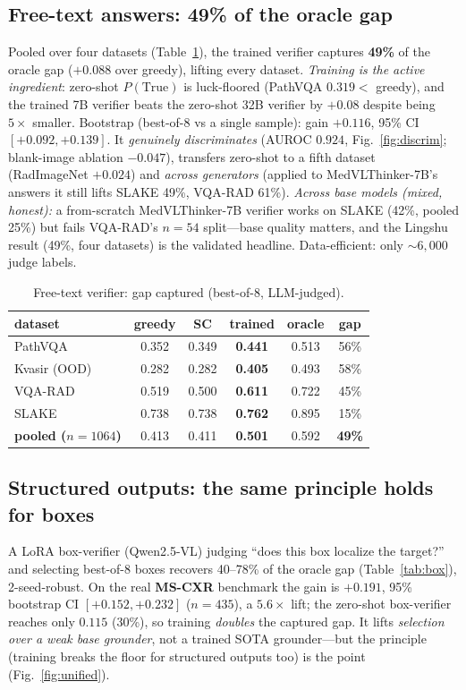 \documentclass[conference]{IEEEtran}
\begin{document}
\subsection{Free-text answers: 49\% of the oracle gap}
Pooled over four datasets (Table~\ref{tab:verif}), the trained verifier captures \textbf{49\%} of the oracle gap ($+0.088$ over greedy), lifting every dataset. \emph{Training is the active ingredient}: zero-shot $P(\text{True})$ is luck-floored (PathVQA $0.319<$ greedy), and the trained 7B verifier beats the zero-shot 32B verifier by $+0.08$ despite being $5\times$ smaller. Bootstrap (best-of-8 vs a single sample): gain $+0.116$, 95\% CI $[+0.092,+0.139]$. It \emph{genuinely discriminates} (AUROC $0.924$, Fig.~\ref{fig:discrim}; blank-image ablation $-0.047$), transfers zero-shot to a fifth dataset (RadImageNet $+0.024$) and \emph{across generators} (applied to MedVLThinker-7B's answers it still lifts SLAKE 49\%, VQA-RAD 61\%). \emph{Across base models (mixed, honest):} a from-scratch MedVLThinker-7B verifier works on SLAKE (42\%, pooled 25\%) but fails VQA-RAD's $n{=}54$ split---base quality matters, and the Lingshu result (49\%, four datasets) is the validated headline. Data-efficient: only ${\sim}6{,}000$ judge labels.

\begin{table}[t]\centering\caption{Free-text verifier: gap captured (best-of-8, LLM-judged).}\label{tab:verif}
\footnotesize
\begin{tabular}{lccccc}
\toprule
dataset & greedy & SC & trained & oracle & gap\\
\midrule
PathVQA & 0.352 & 0.349 & \textbf{0.441} & 0.513 & 56\%\\
Kvasir (OOD) & 0.282 & 0.282 & \textbf{0.405} & 0.493 & 58\%\\
VQA-RAD & 0.519 & 0.500 & \textbf{0.611} & 0.722 & 45\%\\
SLAKE & 0.738 & 0.738 & \textbf{0.762} & 0.895 & 15\%\\
\textbf{pooled ($n{=}1064$)} & 0.413 & 0.411 & \textbf{0.501} & 0.592 & \textbf{49\%}\\
\bottomrule
\end{tabular}
\end{table}

\subsection{Structured outputs: the same principle holds for boxes}
A LoRA box-verifier (Qwen2.5-VL) judging ``does this box localize the target?'' and selecting best-of-8 boxes recovers 40--78\% of the oracle gap (Table~\ref{tab:box}), 2-seed-robust. On the real \textbf{MS-CXR} benchmark the gain is $+0.191$, 95\% bootstrap CI $[+0.152,+0.232]$ ($n{=}435$), a $5.6\times$ lift; the zero-shot box-verifier reaches only $0.115$ (30\%), so training \emph{doubles} the captured gap. It lifts \emph{selection over a weak base grounder}, not a trained SOTA grounder---but the principle (training breaks the floor for structured outputs too) is the point (Fig.~\ref{fig:unified}).
\end{document}
